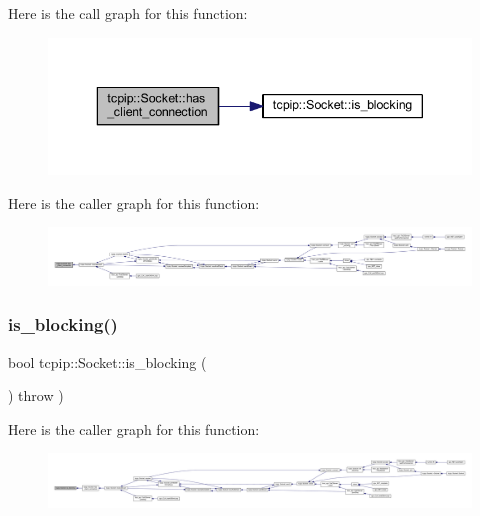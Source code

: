 Here is the call graph for this function\+:
\nopagebreak
\begin{figure}[H]
\begin{center}
\leavevmode
\includegraphics[width=343pt]{classtcpip_1_1_socket_a78436cfed4ad686180491c38e88ebfc3_cgraph}
\end{center}
\end{figure}
Here is the caller graph for this function\+:
\nopagebreak
\begin{figure}[H]
\begin{center}
\leavevmode
\includegraphics[width=350pt]{classtcpip_1_1_socket_a78436cfed4ad686180491c38e88ebfc3_icgraph}
\end{center}
\end{figure}
\mbox{\label{classtcpip_1_1_socket_a4a599332c62974235bde84f2145066b4}} 
\subsubsection{\texorpdfstring{is\+\_\+blocking()}{is\_blocking()}}
{\footnotesize\ttfamily bool tcpip\+::\+Socket\+::is\+\_\+blocking (\begin{DoxyParamCaption}{ }\end{DoxyParamCaption}) throw  ) }

Here is the caller graph for this function\+:
\nopagebreak
\begin{figure}[H]
\begin{center}
\leavevmode
\includegraphics[width=350pt]{classtcpip_1_1_socket_a4a599332c62974235bde84f2145066b4_icgraph}
\end{center}
\end{figure}
\mbox{\label{classtcpip_1_1_socket_ab7e67c84c32557ffb98d940081497d67}} 
